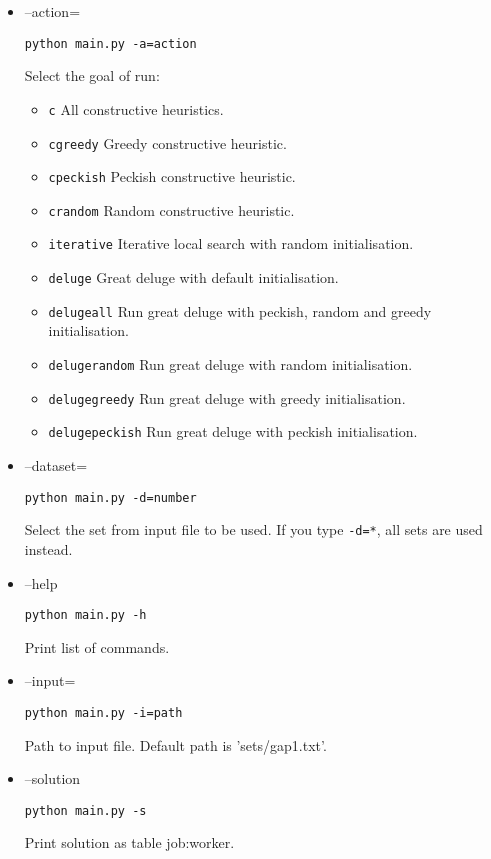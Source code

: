 \documentclass{article}
\begin{document}
\begin{itemize}

\item{--action=}
\begin{verbatim}python main.py -a=action\end{verbatim}
Select the goal of run:
    \begin{itemize}
                \item{\tt{}c} All constructive heuristics.
                \item{\tt{}cgreedy} Greedy constructive heuristic.
                \item{\tt{}cpeckish} Peckish constructive heuristic.
                \item{\tt{}crandom} Random constructive heuristic.
                \item{\tt{}iterative} Iterative local search with random initialisation.
                \item{\tt{}deluge} Great deluge with default initialisation.
                \item{\tt{}delugeall} Run great deluge with peckish, random and greedy initialisation.
                \item{\tt{}delugerandom} Run great deluge with random initialisation.
                \item{\tt{}delugegreedy} Run great deluge with greedy initialisation.
                \item{\tt{}delugepeckish} Run great deluge with peckish initialisation.
    \end{itemize}
        
\item{--dataset=}
\begin{verbatim}python main.py -d=number\end{verbatim}
Select the set from input file to be used. If you type {\tt{}-d=*}, all sets are used instead.

\item{--help}
\begin{verbatim}python main.py -h\end{verbatim}
Print list of commands.

\item{--input=}
\begin{verbatim}python main.py -i=path\end{verbatim}
Path to input file. Default path is 'sets/gap1.txt'.

\item{--solution}
\begin{verbatim}python main.py -s\end{verbatim}
Print solution as table job:worker.


\end{itemize}
\end{document}
